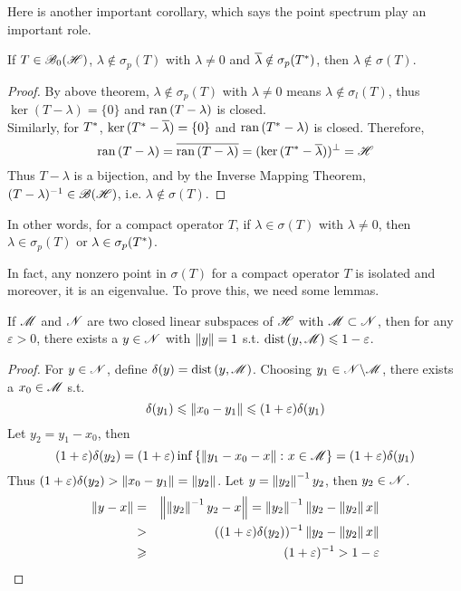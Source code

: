 \documentclass[a4paper,11pt]{report}
\begin{document}
Here is another important corollary, which says the point spectrum play an important role.
\begin{cor}
	If $T \in \mathscr{B}_{0}\mathscr{(H)}$, $\lambda \notin \sigma_p(T)$ with $\lambda \neq 0$ and $\overline{\lambda} \notin \sigma_p(T^{*})$, then $\lambda \notin \sigma(T)$.
\end{cor}
\begin{proof}
	By above theorem, $\lambda \notin \sigma_p(T)$ with $\lambda \neq 0$ means $\lambda \notin \sigma_l(T)$, thus $\ker{(T-\lambda)} = \{0\}$ and $\operatorname{ran}{(T-\lambda)}$ is closed.\\ Similarly, for $T^{*}$, $\ker{(T^{*}-\overline{\lambda})} = \{0\}$ and $\operatorname{ran}{(T^{*}-\lambda)}$ is closed. Therefore,
	\begin{equation*}
		\operatorname{ran}{(T-\lambda)} = \overline{\operatorname{ran}{(T-\lambda)}} = (\ker{(T^{*}-\overline{\lambda})})^{\bot} = \mathscr{H}
	\end{equation*}
	Thus $T-\lambda$ is a bijection, and by the Inverse Mapping Theorem, $(T-\lambda)^{-1} \in \mathscr{B(H)}$, i.e. $\lambda \notin \sigma(T)$.
\end{proof}
\begin{rem}
	In other words, for a compact operator $T$, if $\lambda \in \sigma(T)$ with $\lambda \neq 0$, then $\lambda \in \sigma_p(T)$ or $\lambda \in \sigma_p(T^{*})$.
\end{rem}

In fact, any nonzero point in $\sigma(T)$ for a compact operator $T$ is isolated and moreover, it is an eigenvalue. To prove this, we need some lemmas.

\begin{lem}
	If $\mathscr{M}$ and $\mathscr{N}$ are two closed linear subspaces of $\mathscr{H}$ with $\mathscr{M} \subset \mathscr{N}$, then for any $\varepsilon > 0$, there exists a $y \in \mathscr{N}$ with $\left\lVert y\right\lVert = 1$ s.t. $\operatorname{dist}{(y,\mathscr{M})} \leqslant 1-\varepsilon$.
\end{lem}
\begin{proof}
	For $y \in \mathscr{N}$, define $\delta(y) = \operatorname{dist}{(y,\mathscr{M})}$. Choosing $y_1 \in \mathscr{N} \backslash \mathscr{M}$, there exists a $x_0 \in \mathscr{M}$ s.t.
	\begin{equation*}
		\delta(y_1) \leqslant \left\lVert x_0-y_1\right\lVert \leqslant (1+\varepsilon) \delta (y_1)
	\end{equation*}
	Let $y_2 = y_1-x_0$, then
	\begin{equation*}
		(1+\varepsilon)\delta(y_2) = (1+\varepsilon)\operatorname{inf}{\{\left\lVert y_1-x_0-x\right\lVert \colon x \in \mathscr{M}\}} = (1+\varepsilon)\delta(y_1)
	\end{equation*}
	Thus $(1+\varepsilon)\delta(y_2) > \left\lVert x_0 - y_1\right\lVert = \left\lVert y_2\right\lVert$. Let $y = \left\lVert y_2\right\lVert^{-1}y_2$, then $y_2 \in \mathscr{N}$.
	\begin{eqnarray*}
		\left\lVert y-x\right\lVert &=& \left\lVert\left\lVert y_2\right\lVert^{-1}y_2-x\right\lVert = \left\lVert y_2\right\lVert^{-1}\left\lVert y_2-\left\lVert y_2\right\lVert x\right\lVert \\
		&>& ((1+\varepsilon)\delta(y_2))^{-1} \left\lVert y_2-\left\lVert y_2\right\lVert x\right\lVert \\
		&\geqslant& (1+\varepsilon)^{-1} > 1 - \varepsilon
	\end{eqnarray*}
\end{proof}
\end{document}
